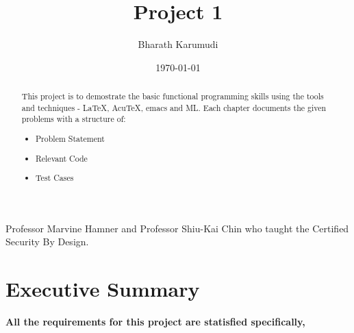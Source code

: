 \documentclass{report}
\title{Project 1}
\author{Bharath Karumudi}
\date{\today}
\begin{document}
\lstset{language=ML}

\maketitle{}

\begin{abstract}

  This project is to demostrate the basic functional programming skills
  using the tools and techniques - \LaTeX{}, AcuTeX, emacs and ML. Each
  chapter documents the given problems with a structure of:
 
  \begin{itemize}
  \item Problem Statement
  \item Relevant Code
  \item Test Cases
  \end{itemize}

\end{abstract}

\begin{acknowledgments}
  Professor Marvine Hamner and Professor Shiu-Kai Chin who taught the
  Certified Security By Design.
\end{acknowledgments}

\tableofcontents{}

\chapter{Executive Summary}
\label{cha:executive-summary}
\textbf{All the requirements for this project are statisfied specifically,}
\end{document}

